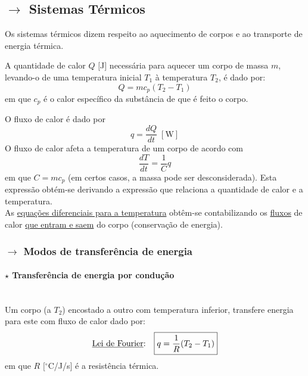 \subsection[3.3 Sistemas Térmicos]{$\rightarrow$ Sistemas Térmicos}
\label{sec:mechanics-thermic}

Os sistemas térmicos dizem respeito ao aquecimento de corpos e ao transporte de energia térmica.

\begin{mdframed}
    A quantidade de calor $Q$ $[$J$]$ necessária para aquecer um corpo de massa $m$, levando-o de uma temperatura inicial $T_1$ à temperatura $T_2$, é dado por:
    $$
        Q = m c_p (T_2 - T_1)
    $$
    em que $c_p$ é o calor específico da substância de que é feito o corpo.
\end{mdframed}

\begin{mdframed}
    O fluxo de calor é dado por
    $$
        q = \frac{dQ}{dt}\; [\text{W}]
    $$
    O fluxo de calor afeta a temperatura de um corpo de acordo com
    $$
        \boxed{\frac{dT}{dt} = \frac{1}{C} q}
    $$
    \noindent em que $C = m c_p$ (em certos casos, a massa pode ser desconsiderada). Esta expressão obtém-se derivando a expressão que relaciona a quantidade de calor e a temperatura.
    \\[6pt]
    As \underline{equações diferenciais para a temperatura} obtêm-se contabilizando os \underline{fluxos} de calor \underline{que entram e saem} do corpo (conservação de energia).
\end{mdframed}

\subsubsection[3.3.1 Modos de transferência de energia]{$\rightarrow$ Modos de transferência de energia}

\paragraph[3.3.1.1 Transferência de energia por condução]{$\pmb{\star}$ Transferência de energia por condução}\mbox{}\\
Um corpo (a $T_2$) encostado a outro com temperatura inferior, transfere energia para este com fluxo de calor dado por:  
$$
    \text{\underline{Lei de Fourier}:}\quad \boxed{q = \frac{1}{R} (T_2 - T_1)}
$$
\noindent em que $R$ $[$$^{\circ}$C/J/s$]$ é a resistência térmica.


